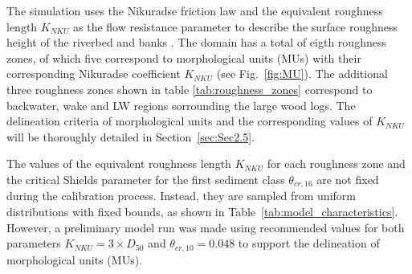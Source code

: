 \documentclass[draft,linenumbers,onecolumn]{agujournal2019} %
\begin{document}
The simulation uses the Nikuradse friction law and the equivalent roughness length $K_{NKU}$ as the flow resistance parameter to describe the surface roughness height of the riverbed and banks \cite{nikuradse1933stroemungsgesetze,marriott2010hydraulic,webber2018fluid,hervouet2020telemac2d}. The domain has a total of eigth roughness zones, of which five correspond to morphological units (MUs) with their corresponding Nikuradse coefficient $K_{NKU}$ (see Fig.~\ref{fig:MU}). The additional three roughness zones shown in table \ref{tab:roughness_zones} correspond to backwater, wake and LW regions sorrounding the large wood logs. The delineation criteria of morphological units and the corresponding values of $K_{NKU}$ will be thoroughly detailed in Section~\ref{sec:Sec2.5}.


The values of the equivalent roughness length $K_{NKU}$ for each roughness zone and the critical Shields parameter for the first sediment class $\theta_{cr,16}$ are not fixed during the calibration process. Instead, they are sampled from uniform distributions with fixed bounds, as shown in Table~\ref{tab:model_characteristics}. However, a preliminary model run was made using recommended values for both parameters $K_{NKU} = 3 \times D_{50}$ and $\theta_{cr,10} = 0.048$ to support the delineation of morphological units (MUs).


%
%

\end{document}
